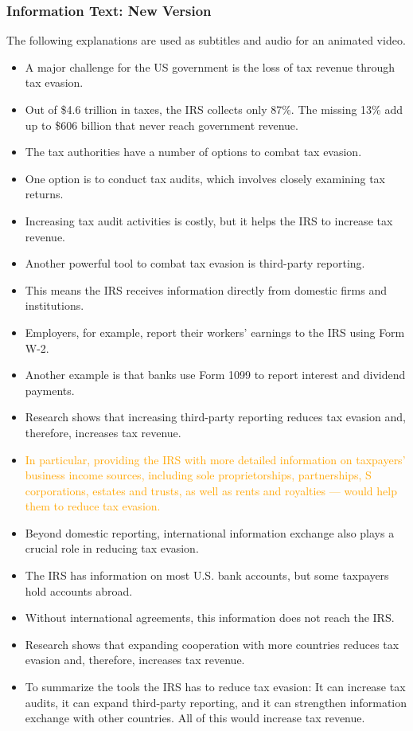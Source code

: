 \documentclass[11pt]{article}
\newcommand{\tk}[1]{\textcolor{orange}{#1}}
\begin{document}
\subsubsection*{Information Text: New Version}
The following explanations are used as subtitles and audio for an animated video.
\begin{itemize}
\item A major challenge for the US government is the loss of tax revenue through tax evasion.
\item Out of \$4.6 trillion in taxes, the IRS collects only 87\%. The missing 13\% add up to \$606 billion that never reach government revenue. 
\item The tax authorities have a number of options to combat tax evasion.
\item One option is to conduct tax audits, which involves closely examining tax returns.
\item Increasing tax audit activities is costly, but it helps the IRS to increase tax revenue.
\item Another powerful tool to combat tax evasion is third-party reporting. 
\item This means the IRS receives information directly from domestic firms and institutions.
\item Employers, for example, report their workers’ earnings to the IRS using Form W-2.
\item Another example is that banks use Form 1099 to report interest and dividend payments. 
\item Research shows that increasing third-party reporting reduces tax evasion and, therefore, increases tax revenue.
\item \tk{In particular, providing the IRS with more detailed information on taxpayers’ business income sources, including sole proprietorships, partnerships, S corporations, estates and trusts, as well as rents and royalties — would help them to reduce tax evasion.}
\item Beyond domestic reporting, international information exchange also plays a crucial role in reducing tax evasion. 
\item The IRS has information on most U.S. bank accounts, but some taxpayers hold accounts abroad.
\item Without international agreements, this information does not reach the IRS.
\item Research shows that expanding cooperation with more countries reduces tax evasion and, therefore, increases tax revenue.
\item To summarize the tools the IRS has to reduce tax evasion: It can increase tax audits, it can expand third-party reporting, and it can strengthen information exchange with other countries. All of this would increase tax revenue. 
\end{itemize}
\end{document}
